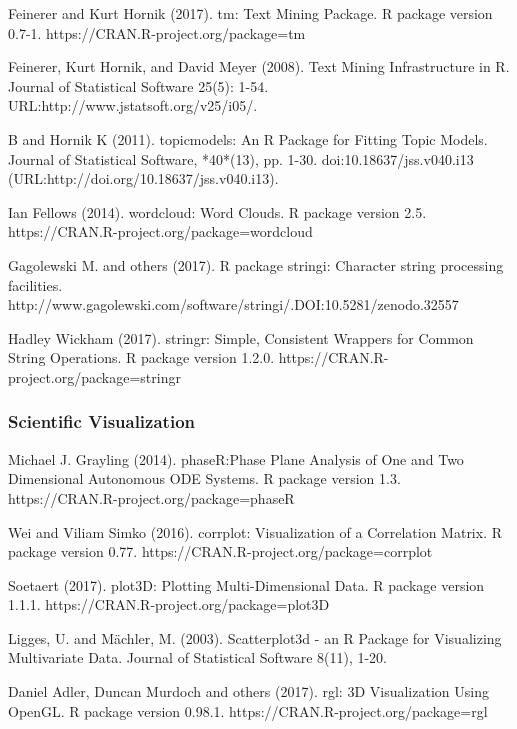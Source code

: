 \documentclass[preprint, 8pt]{elsarticle}
\theoremstyle{definition}
\begin{document}
\begin{thebibliography}{00}
  Feinerer and Kurt Hornik (2017).
\newblock tm: Text Mining Package. 
\newblock R package version 0.7-1. https://CRAN.R-project.org/package=tm

  Feinerer, Kurt Hornik, and David Meyer (2008). 
\newblock Text Mining Infrastructure in R. 
\newblock Journal of Statistical Software 25(5): 1-54. URL:http://www.jstatsoft.org/v25/i05/.

 B and Hornik K (2011).
\newblock topicmodels: An R Package for Fitting Topic Models.
\newblock Journal of Statistical Software, *40*(13), pp. 1-30. doi:10.18637/jss.v040.i13 (URL:http://doi.org/10.18637/jss.v040.i13).

 Ian Fellows (2014). 
\newblock wordcloud: Word Clouds. R package version 2.5.
\newblock https://CRAN.R-project.org/package=wordcloud

 Gagolewski M. and others (2017). 
\newblock R package stringi: Character string processing facilities. 
\newblock http://www.gagolewski.com/software/stringi/.DOI:10.5281/zenodo.32557

 Hadley Wickham (2017).
\newblock stringr: Simple, Consistent Wrappers for Common String Operations. 
\newblock R package version 1.2.0. https://CRAN.R-project.org/package=stringr

\subsubsection{Scientific Visualization}

Michael J. Grayling (2014). 
\newblock phaseR:Phase Plane Analysis of One and Two Dimensional Autonomous ODE Systems. 
\newblock R package version 1.3. https://CRAN.R-project.org/package=phaseR

 Wei and Viliam Simko (2016).
\newblock corrplot: Visualization of a Correlation Matrix. 
\newblock R package version 0.77. https://CRAN.R-project.org/package=corrplot

 Soetaert (2017). 
\newblock plot3D: Plotting Multi-Dimensional Data. 
\newblock R package version 1.1.1. https://CRAN.R-project.org/package=plot3D

 Ligges, U. and Mächler, M. (2003).
\newblock Scatterplot3d - an R Package for Visualizing Multivariate Data.
\newblock Journal of Statistical Software 8(11), 1-20.

Daniel Adler, Duncan Murdoch and others (2017). 
\newblock rgl: 3D Visualization Using OpenGL. 
\newblock R package version 0.98.1. https://CRAN.R-project.org/package=rgl


\end{thebibliography}
\end{document}
